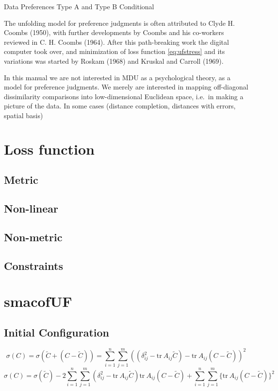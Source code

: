 \documentclass[
  12pt,
]{article}
\begin{document}
Data Preferences Type A and Type B Conditional

The unfolding model for preference judgments is often attributed to Clyde H. Coombs (1950),
with further developments by Coombs and his co-workers reviewed in C. H. Coombs (1964).
After this path-breaking work the digital computer took over, and minimization of loss function
\eqref{eq:ufstress} and its variations was started by
Roskam (1968) and Kruskal and Carroll (1969).

In this manual we are not interested in MDU as a psychological theory, as a model for
preference judgments. We merely are interested in mapping off-diagonal dissimilarity
comparisons into low-dimensional Euclidean space, i.e.~in making a picture of the
data. In some cases (distance completion, distances with errors, spatial basis)

\section{Loss function}\label{loss-function}

\subsection{Metric}\label{metric}

\subsection{Non-linear}\label{non-linear}

\subsection{Non-metric}\label{non-metric}

\subsection{Constraints}\label{constraints}

\section{smacofUF}\label{smacofuf}

\subsection{Initial Configuration}\label{initial-configuration}

\[
\sigma(C)=\sigma(\tilde C+(C-\tilde C))=\sum_{i=1}^n\sum_{j=1}^m((\delta_{ij}^2-\text{tr}\ A_{ij}\tilde C)-\text{tr}\ A_{ij}(C-\tilde C))^2
\]
\[
\sigma(C)=\sigma(\tilde C)-2\sum_{i=1}^n\sum_{j=1}^m(\delta_{ij}^2-\text{tr}\ A_{ij}\tilde C)\text{tr}\ A_{ij}(C-\tilde C)+\sum_{i=1}^n\sum_{j=1}^m\{\text{tr}\ A_{ij}(C-\tilde C)\}^2
\]
\end{document}
